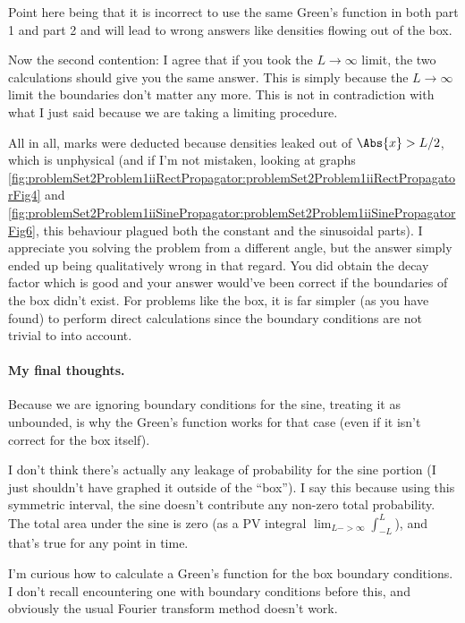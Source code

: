 {Point here being that it is incorrect to use the same Green's function in both part 1 and part 2 and will lead to wrong answers like densities flowing out of the box.

Now the second contention: I agree that if you took the $L \rightarrow \infty$ limit, the two calculations should give you the same answer.  This is simply because the $L \rightarrow \infty$ limit the boundaries don't matter any more.  This is not in contradiction with what I just said because we are taking a limiting procedure.

All in all, marks were deducted because densities leaked out of $\Abs{x} > L/2$, which is unphysical (and if I'm not mistaken, looking at graphs \cref{fig:problemSet2Problem1iiRectPropagator:problemSet2Problem1iiRectPropagatorFig4} and \cref{fig:problemSet2Problem1iiSinePropagator:problemSet2Problem1iiSinePropagatorFig6}, this behaviour plagued both the constant and the sinusoidal parts).  I appreciate you solving the problem from a different angle, but the answer simply ended up being qualitatively wrong in that regard.  You did obtain the decay factor which is good and your answer would've been correct if the boundaries of the box didn't exist.  For problems like the box, it is far simpler (as you have found) to perform direct calculations since the boundary conditions are not trivial to into account.

\paragraph{My final thoughts.}

Because we are ignoring boundary conditions for the sine, treating it as unbounded, is why the Green's function works for that case (even if it isn't correct for the box itself).

I don't think there's actually any leakage of probability for the sine portion (I just shouldn't have graphed it outside of the ``box'').  I say this because using this symmetric interval, the sine doesn't contribute any non-zero total probability.  The total area under the sine is zero (as a PV integral $\lim_{L->\infty} \int_{-L}^L$), and that's true for any point in time.

I'm curious how to calculate a Green's function for the box boundary conditions.  I don't recall encountering one with boundary conditions before this, and obviously the usual Fourier transform method doesn't work.
}
